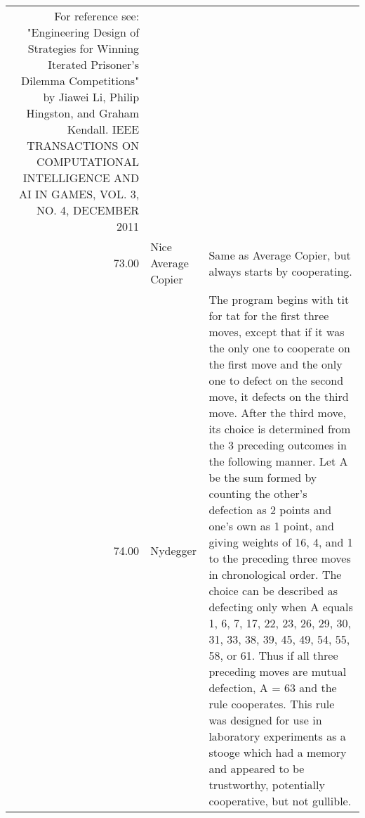 \begin{tabular}{rll}
	For reference see: "Engineering Design of Strategies for Winning
	Iterated Prisoner's Dilemma Competitions" by Jiawei Li, Philip Hingston,
	and Graham Kendall.  IEEE TRANSACTIONS ON COMPUTATIONAL INTELLIGENCE AND AI
	IN GAMES, VOL. 3, NO. 4, DECEMBER 2011                                                                                                                                                                                                                                                                                                                                                                                                                                                                                                                                                                                                                                                                    \\
	73.00  & Nice Average Copier         & Same as Average Copier, but always starts by cooperating.                                                                         \\
	74.00  & Nydegger                    & The program begins with tit for tat for the first three moves, except that
                                        	if it was the only one to cooperate on the first move and the only one to
                                        	defect on the second move, it defects on the third move. After the third move,
                                        	its choice is determined from the 3 preceding outcomes in the following manner.
                                        	Let A be the sum formed by counting the other's defection as 2 points and one's
                                        	own as 1 point, and giving weights of 16, 4, and 1 to the preceding three
                                        	moves in chronological order. The choice can be described as defecting only
                                        	when A equals 1, 6, 7, 17, 22, 23, 26, 29, 30, 31, 33, 38, 39, 45, 49, 54,
                                        	55, 58, or 61. Thus if all three preceding moves are mutual defection,
                                        	A = 63 and the rule cooperates. This rule was designed for use in laboratory
                                        	experiments as a stooge which had a memory and appeared to be trustworthy,
                                        	potentially cooperative, but not gullible.


\end{tabular}
